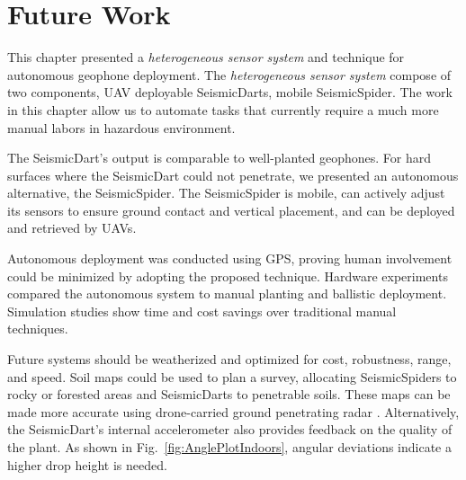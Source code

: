 \section[Conclusion]{Future Work}

This chapter presented a \emph{heterogeneous sensor system} and technique for autonomous geophone deployment.
The \emph{heterogeneous sensor system} compose of two components, UAV deployable SeismicDarts, mobile SeismicSpider.
The work in this chapter allow us to automate tasks that currently require a much more manual labors in hazardous environment.

The SeismicDart's output is comparable to well-planted geophones. 
For hard surfaces where the SeismicDart could not penetrate, we presented an autonomous alternative, the SeismicSpider.  
The SeismicSpider is mobile, can actively adjust its sensors to ensure ground contact and vertical placement, and can be deployed and retrieved by UAVs.

Autonomous deployment was conducted using GPS, proving human involvement could be minimized by adopting the proposed technique.
Hardware experiments compared the autonomous system to manual planting and ballistic deployment.
Simulation studies show time and cost savings over traditional manual techniques.

Future systems should be weatherized and optimized for cost, robustness, range, and speed.
Soil maps could be used to plan a survey, allocating SeismicSpiders to rocky or forested areas and SeismicDarts to penetrable soils.
These maps can be made more accurate using drone-carried ground penetrating radar \cite{merz2015new}.
Alternatively, the  SeismicDart's internal accelerometer also provides feedback on the quality of the plant.
As shown in Fig.~\ref{fig:AnglePlotIndoors}, angular deviations indicate a higher drop height is needed.
